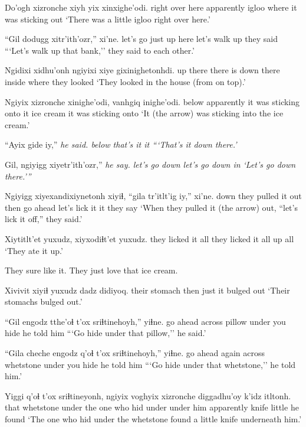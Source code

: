 \documentclass[12pt]{article}
\begin{document}
\gll Do'ogh xizronche {xiyh yix} xinxighe'odi.
{right over here} apparently igloo {where it was sticking out}
\glt `There was a little igloo right over here.'
\glend

\gll ``Gil dodugg xitr'ith'ozr,'' xi'ne.
{let's go} {just up here} {let's walk up} {they said}
\glt ```Let's walk up that bank,'' they said to each other.'
\glend

\gll Ngidixi xidhu'onh ngiyixi xiye gixinighetonhdi.
{up there} {there is} {down there} inside {where they looked}
\glt `They looked in the house (from on top).'
\glend

\gll Ngiyix xizronche xinighe'odi, vanhgiq inighe'odi.
below apparently {it was sticking onto it} {ice cream} {it was sticking onto}
\glt `It (the arrow) was sticking into the ice cream.'
\glend

\gll ``Ayix gide iy,'' \em {he said.}
below {that's it} it
\glt ```That's it down there.'
\glend

\gll Gil, ngiyigg xiyetr'ith'ozr,'' \em {he say.}
{let's go} down {let's go down in}
\glt `Let's go down there.'''
\glend

\gll Ngiyigg xiyexandixiynetonh xiyiɬ, ``gila tr'itlt'ig iy,'' xi'ne.
down {they pulled it out} then {go ahead} {let's lick it} it {they say}
\glt `When they pulled it (the arrow) out, ``let's lick it off,'' they said.'
\glend

\gll Xiytitlt'et yuxudz, xiyxodiɬt'et yuxudz.
{they licked it} all {they licked it all up} all
\glt `They ate it up.'
\glend

They sure like it. They just love that ice cream.

\gll Xivivit xiyiɬ yuxudz {dadz didiyoq.}
{their stomach} then just {it bulged out}
\glt `Their stomachs bulged out.'
\glend

\gll ``Gil engodz tthe'oɬ t'ox sriɬtinehoyh,'' yiɬne.
{go ahead} across pillow under {you hide} {he told him}
\glt ```Go hide under that pillow,'' he said.'
\glend

\gll ``Gila cheche engodz q'oɬ t'ox sriɬtinehoyh,'' yiɬne.
{go ahead} again across whetstone under {you hide} {he told him}
\glt ```Go hide under that whetstone,'' he told him.'
\glend

\gll Yiggi q'oɬ t'ox sriɬtineyonh, ngiyix voghyix xizronche diggadhu'oy k'idz itltonh.
that whetstone under {the one who hid} under {under him} apparently knife little {he found}
\glt `The one who hid under the whetstone found a little knife underneath him.'
\glend
\end{document}
